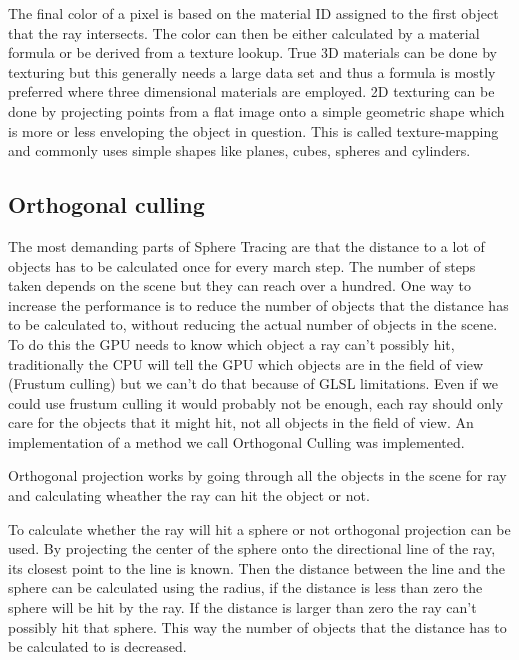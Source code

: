 			The final color of a pixel is based on the material ID assigned to
			the first object that the ray intersects. The color can then be
			either calculated by a material formula or be derived from a
			texture lookup. True 3D materials can be done by texturing but this
			generally needs a large data set and thus a formula is mostly
			preferred where three dimensional materials are employed. 2D
			texturing can be done by projecting points from a flat image onto a
			simple geometric shape  which is more or less enveloping the object
			in question. This is called texture-mapping and commonly uses
			simple shapes like planes, cubes, spheres and cylinders. 


		\subsection{Orthogonal culling}

			The most demanding parts of Sphere Tracing are that the distance to
			a lot of objects has to be calculated once for every march step.
			The number of steps taken depends on the scene but they can reach
			over a hundred. One way to increase the performance is to reduce
			the number of objects that the distance has to be calculated to,
			without reducing the actual number of objects in the scene. To do
			this the GPU needs to know which object a ray can't possibly hit,
			traditionally the CPU will tell the GPU which objects are in the
			field of view (Frustum culling) but we can't do that because of
			GLSL limitations. Even if we could use frustum culling it would
			probably not be enough, each ray should only care for the objects
			that it might hit, not all objects in the field of view.  An
			implementation of a method we call Orthogonal Culling was
			implemented.

			Orthogonal projection works by going through all the objects in the 
			scene for ray and calculating wheather the ray can hit the object
			or not. 

			To calculate whether the ray will hit a sphere or not orthogonal
			projection can be used. By projecting the center of the sphere onto
			the directional line of the ray, its closest point to the line is
			known.  Then the distance between the line and the sphere can be
			calculated using the radius, if the distance is less than zero the
			sphere will be hit by the ray. If the distance is larger than zero
			the ray can't possibly hit that sphere. This way the number of
			objects that the distance has to be calculated to is decreased.

